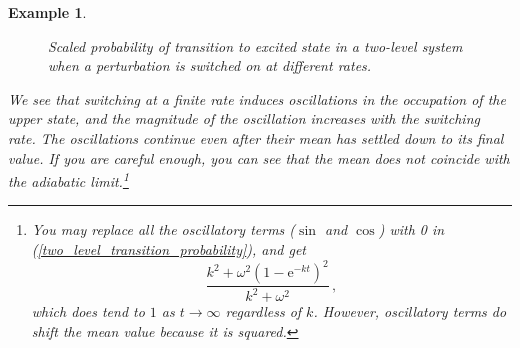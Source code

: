 \documentclass{article}
\theoremstyle{plain}\theoremheaderfont{\normalfont\itshape}\theorembodyfont{\rmfamily}\theoremseparator{.}\newtheorem*{rem}{Remark}\newtheorem*{ex}{Example}\newtheorem*{proof}{Proof}\newtheorem*{altp}{Alternative proof}
\theoremstyle{plain}\theoremheaderfont{\normalfont\bfseries}\theorembodyfont{\rmfamily}\theoremseparator{.}\newtheorem{thm}{Theorem}[section]\newtheorem{lem}[thm]{Lemma}\newtheorem{prop}[thm]{Proposition}\newtheorem*{cor}{Corollary}\newtheorem{defn}[thm]{Definition}\newtheorem{clm}[thm]{Claim}\newtheorem{clminproof}{Claim}
\theoremstyle{break}\theoremheaderfont{\normalfont\itshape}\theorembodyfont{\rmfamily}\theoremseparator{.\medskip}\newtheorem*{proofskip}{Proof}\newtheorem*{exs}{Examples}\newtheorem*{rems}{Remarks}
\theoremstyle{break}\theoremheaderfont{\normalfont\bfseries}\theorembodyfont{\rmfamily}\theoremseparator{.\medskip}\newtheorem{lemskip}[thm]{Lemma}\newtheorem{defnskip}[thm]{Definition}\newtheorem{propskip}[thm]{Proposition}\newtheorem{thmskip}[thm]{Theorem}
\numberwithin{equation}{section}
\newcommand{\ee}{\mathrm{e}}
\newcommand{\abs}[1]{\left| #1 \right|}
\begin{document}
\begin{ex}
        \begin{figure}
            \centering
            \caption{Scaled probability of transition to excited state in a two-level system when a perturbation is switched on at different rates.}
        \end{figure}

        We see that switching at a finite rate induces oscillations in the occupation of the upper state, and the magnitude of the oscillation increases with the switching rate. The oscillations continue even after their mean has settled down to its final value. If you are careful enough, you can see that the mean does not coincide with the adiabatic limit.\footnote{You may replace all the oscillatory terms (\(\sin\) and \(\cos\)) with 0 in (\ref{two_level_transition_probability}), and get
        \begin{equation}
            \frac{k^2+\omega^2(1-\ee^{-kt})^2}{k^2+\omega^2}\,,
        \end{equation}
        which does tend to \(1\) as \(t\to\infty\) regardless of \(k\). However, oscillatory terms do shift the mean value because it is squared.}
    \end{ex}
\end{document}

